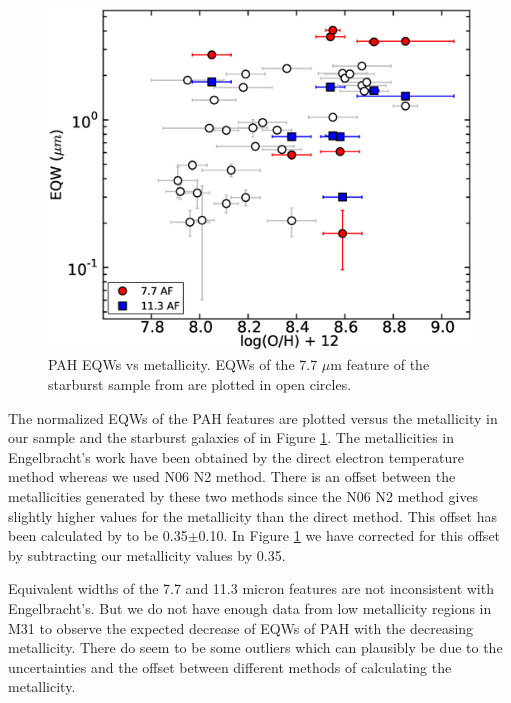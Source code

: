 \begin{figure}

\centering
\includegraphics[scale=0.27]{./oxyvseqw.eps}
\caption{ PAH EQWs vs metallicity. EQWs of the 7.7 $\mu$m feature of the starburst sample from \citet{Engelbracht_2008} are plotted in open circles.}
\label{metalicityVseqw}
\end{figure}

	The normalized EQWs of the PAH features are plotted versus the metallicity in our sample and the starburst galaxies of \citet{Engelbracht_2008} in Figure \ref{metalicityVseqw}. The metallicities in Engelbracht's work have been obtained by the direct electron temperature method \citep{Skillman1998} whereas we used N06 N2 method. There is an offset between the metallicities generated by these two methods since the N06 N2 method gives slightly higher values for the metallicity than the direct method. This offset has been calculated by \citet{Mitchel2014} to be 0.35$\pm$0.10. In Figure \ref{metalicityVseqw} we have corrected for this offset by subtracting our metallicity values by 0.35. 
	
	Equivalent widths of the 7.7 and 11.3 micron features are not inconsistent with Engelbracht's. But we do not have enough data from low metallicity regions in M31 to observe the expected decrease of EQWs of PAH with the decreasing metallicity.  There do seem to be some outliers which can plausibly be due to the uncertainties  and the offset between different methods of calculating the metallicity.  



